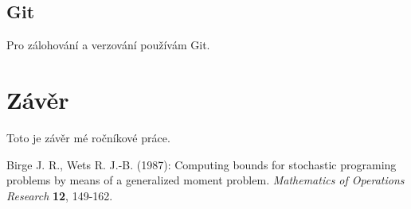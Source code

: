 \documentclass[12pt,a4paper]{report}
\begin{document}
	\section{Git}
		Pro zálohování a verzování používám Git.

\chapter{Závěr}
Toto je závěr mé ročníkové práce.

\begin{thebibliography}{99}

Birge J. R., Wets R. J.-B. (1987): Computing bounds for stochastic programing problems by means of a generalized moment problem. \textit{Mathematics of Operations Research} \textbf{12}, 149-162.
\end{thebibliography}


\openright
\end{document}
